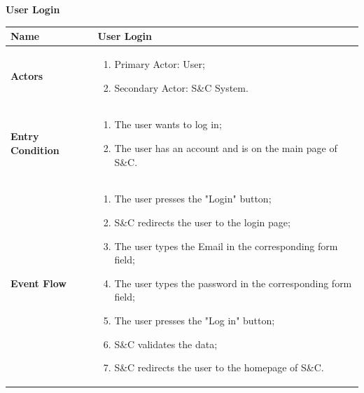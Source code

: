         \begin{enumerate}[label=\textbf{[US\arabic*]}, left = 0pt, align = left]
            \item \textbf{User Login}
            
            \begin{longtable}{|l|p{11cm}|}  
                \hline
                \textbf{Name} & 
                    \textbf{User Login} \\
                \hline
                
                \textbf{Actors} & 
                    \begin{enumerate}[label=\textbullet, itemsep=0em]
                        \item Primary Actor: User;
                        \item Secondary Actor: S\&C System.
                    \end{enumerate} \\
                \hline
                
                \textbf{Entry Condition} & 
                    \begin{enumerate}[label=\textbullet, itemsep=0em]
                        \item The user wants to log in;
                        \item The user has an account and is on the main page of S\&C.
                    \end{enumerate} \\
                \hline
                
                \textbf{Event Flow} &
                    \begin{enumerate}[label=\arabic*., itemsep=0.2em]
                        \item The user presses the "Login" button;
                        \item S\&C redirects the user to the login page;
                        \item The user types the Email in the corresponding form field;
                        \item The user types the password in the corresponding form field;
                        \item The user presses the "Log in" button;
                        \item S\&C validates the data;
                        \item S\&C redirects the user to the homepage of S\&C.
                    \end{enumerate} \\
                \hline
                

\end{longtable}
\end{enumerate}
